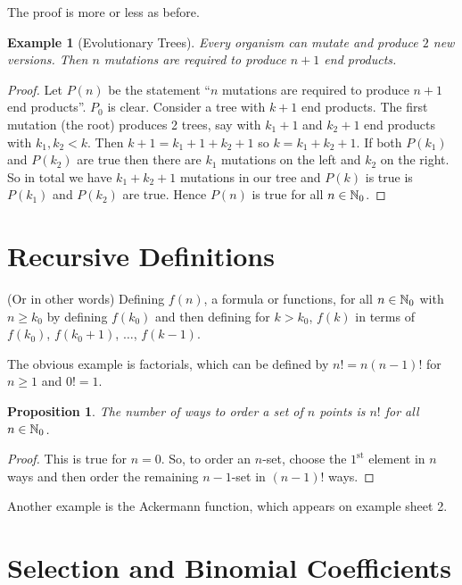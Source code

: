 \documentclass{notes}
\theoremstyle{plain}
\newtheorem*{example}{Example}
\newtheorem*{proposition}{Proposition}
\begin{document}
The proof is more or less as before.

\begin{example}[Evolutionary Trees]
Every organism can mutate and produce $2$ new versions.  Then
$n$ mutations are required to produce $n+1$ end products.
\end{example}

\begin{proof}
Let $P(n)$ be the statement ``$n$ mutations are required to produce
$n+1$ end products''.  $P_0$ is clear.  Consider a tree with $k+1$
end products.  The first mutation (the root) produces 2 trees, say
with $k_1 + 1$ and $k_2 + 1$ end products with $k_1, k_2 < k$.  Then
$k + 1 = k_1 + 1 + k_2 + 1$ so $k = k_1 + k_2 + 1$.  If both
$P(k_1)$ and $P(k_2)$ are true then there are $k_1$ mutations on the left
and $k_2$ on the right.  So in total we have $k_1 + k_2 + 1$ mutations
in our tree and $P(k)$ is true is $P(k_1)$ and $P(k_2)$ are true.  Hence
$P(n)$ is true for all $n \in \mathbb{N}_0$.
\end{proof}

\section{Recursive Definitions}

(Or in other words)  Defining $f(n)$, a formula or functions, for all
$n \in \mathbb{N}_0$ with $n \ge k_0$ by defining $f(k_0)$ and then defining
for $k > k_0$, $f(k)$ in terms of $f(k_0)$, $f(k_0 + 1)$, $\dots$, $f(k-1)$.

The obvious example is factorials, which can be defined by $n! = n (n-1)!$
for $n \ge 1$ and $0! = 1$.

\begin{proposition}
The number of ways to order a set of $n$ points is $n!$ for all $n \in \mathbb{N}_0$.
\end{proposition}

\begin{proof}
This is true for $n=0$.  So, to order an $n$-set, choose the $1^{\text{st}}$
element in $n$ ways and then order the remaining $n-1$-set in $(n-1)!$ ways.
\end{proof}

Another example is the Ackermann function, which appears on example sheet 2.

\section{Selection and Binomial Coefficients}
\end{document}
